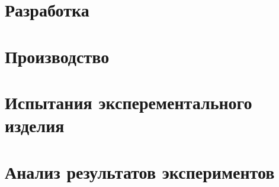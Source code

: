 \section{Разработка}


\section{Производство}


\section{Испытания эксперементального изделия}
\section{Анализ результатов экспериментов}